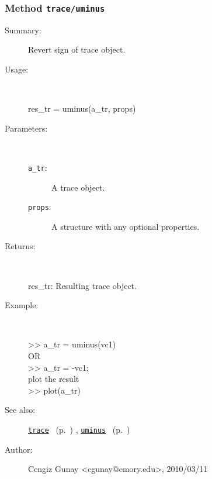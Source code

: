 \subsubsection[Method \texttt{uminus}]{Method \texttt{trace/uminus}}%
%
\label{ref_trace__uminus}%
\hypertarget{ref_trace__uminus}{}%
\begin{description}
\item[Summary:]Revert sign of trace object.
%
\item[Usage:]~%
\begin{lyxcode}%
res\_tr = uminus(a\_tr, props)
%
\end{lyxcode}%
%
%
\item[Parameters:]~
\begin{description}%
\item[\texttt{a\_tr}:]
 A trace object.
\item[\texttt{props}:]
 A structure with any optional properties.
\end{description}%
%
\item[Returns:
]~

   res\_tr: Resulting trace object.
%
\item[Example:]~
\begin{lyxcode} >> a\_tr = uminus(vc1)
\\%
 OR
\\%
 >> a\_tr = -vc1;
\\%
 plot the result
\\%
 >> plot(a\_tr)
\\%
\end{lyxcode}
%
\item[See also:]%
\hyperlink{ref_trace}{\texttt{trace}}%
\ (p.~\pageref{ref_trace})%
%
, \hyperlink{ref_uminus}{\texttt{uminus}}%
\ (p.~\pageref{ref_uminus})%
%
%
\item[Author:]%
Cengiz Gunay <cgunay@emory.edu>, 2010/03/11
%
\end{description}
\methodline%
